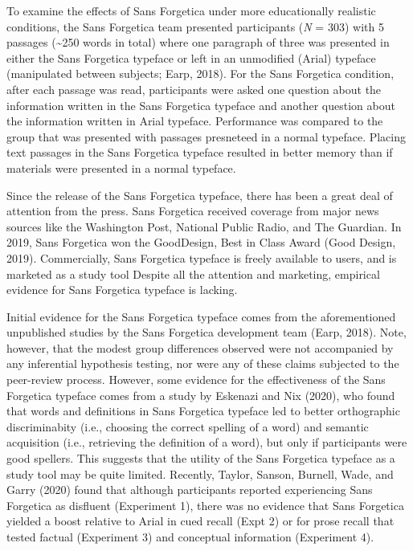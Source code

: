 \documentclass[
  english,
  jou]{apa6}
\begin{document}
To examine the effects of Sans Forgetica under more educationally realistic conditions, the Sans Forgetica team presented participants (\emph{N} = 303) with 5 passages (\textasciitilde250 words in total) where one paragraph of three was presented in either the Sans Forgetica typeface or left in an unmodified (Arial) typeface (manipulated between subjects; Earp, 2018). For the Sans Forgetica condition, after each passage was read, participants were asked one question about the information written in the Sans Forgetica typeface and another question about the information written in Arial typeface. Performance was compared to the group that was presented with passages presneteed in a normal typeface. Placing text passages in the Sans Forgetica typeface resulted in better memory than if materials were presented in a normal typeface.

Since the release of the Sans Forgetica typeface, there has been a great deal of attention from the press. Sans Forgetica received coverage from major news sources like the Washington Post, National Public Radio, and The Guardian. In 2019, Sans Forgetica won the GoodDesign, Best in Class Award (Good Design, 2019). Commercially, Sans Forgetica typeface is freely available to users, and is marketed as a study tool Despite all the attention and marketing, empirical evidence for Sans Forgetica typeface is lacking.

Initial evidence for the Sans Forgetica typeface comes from the aforementioned unpublished studies by the Sans Forgetica development team (Earp, 2018). Note, however, that the modest group differences observed were not accompanied by any inferential hypothesis testing, nor were any of these claims subjected to the peer-review process. However, some evidence for the effectiveness of the Sans Forgetica typeface comes from a study by Eskenazi and Nix (2020), who found that words and definitions in Sans Forgetica typeface led to better orthographic discriminabity (i.e., choosing the correct spelling of a word) and semantic acquisition (i.e., retrieving the definition of a word), but only if participants were good spellers. This suggests that the utility of the Sans Forgetica typeface as a study tool may be quite limited. Recently, Taylor, Sanson, Burnell, Wade, and Garry (2020) found that although participants reported experiencing Sans Forgetica as disfluent (Experiment 1), there was no evidence that Sans Forgetica yielded a boost relative to Arial in cued recall (Expt 2) or for prose recall that tested factual (Experiment 3) and conceptual information (Experiment 4).
\end{document}
